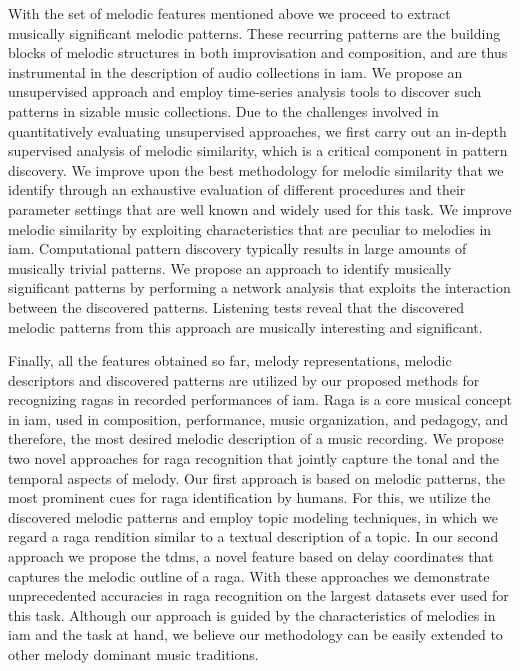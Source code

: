 With the set of melodic features mentioned above we proceed to extract musically significant melodic patterns. These recurring patterns are the building blocks of melodic structures in both improvisation and composition, and are thus instrumental in the description of audio collections in \gls{iam}. We propose an unsupervised approach and employ time-series analysis tools to discover such patterns in sizable music collections. Due to the challenges involved in quantitatively evaluating unsupervised approaches, we first carry out an in-depth supervised analysis of  melodic similarity, which is a critical component in pattern discovery. We improve upon the best methodology for melodic similarity that we identify through an exhaustive evaluation of different procedures and their parameter settings that are well known and widely used for this task. We improve melodic similarity by exploiting characteristics that are peculiar to melodies in \gls{iam}. Computational pattern discovery typically results in large amounts of musically trivial patterns. We propose an approach to identify musically significant patterns by performing a network analysis that exploits the interaction between the discovered patterns. Listening tests reveal that the discovered melodic patterns from this approach are musically interesting and significant.

Finally, all the features obtained so far, melody representations, melodic descriptors and discovered patterns are utilized by our proposed methods for recognizing \glspl{raga} in recorded performances of \gls{iam}. Raga is a core musical concept in \gls{iam}, used in composition, performance, music organization, and pedagogy, and therefore, the most desired melodic description of a music recording. We propose two novel approaches for raga recognition that jointly capture the tonal and the temporal aspects of melody. Our first approach is based on melodic patterns, the most prominent cues for raga identification by humans. For this, we utilize the discovered melodic patterns and employ topic modeling techniques, in which we regard a \gls{raga} rendition similar to a textual description of a topic. In our second approach we propose the \gls{tdms}, a novel feature based on delay coordinates that captures the melodic outline of a \gls{raga}. With these approaches we demonstrate unprecedented accuracies in \gls{raga} recognition on the largest datasets ever used for this task.  Although our approach is guided by the characteristics of melodies in \gls{iam} and the task at hand, we believe our methodology can be easily extended to other melody dominant music traditions.

